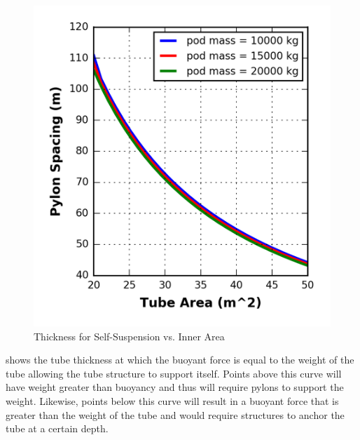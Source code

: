 \begin{figure}
	\centering
	\includegraphics{../../images/graphs/overland_structural_trades/pylon_spacing_vs_tube_area.png}
	\caption{Thickness for Self-Suspension vs. Inner Area}
	\label{fig:thick_susp_vs_area}
\end{figure}

 shows the tube thickness at which the buoyant
force is equal to the weight of the tube allowing the tube structure to support itself.
Points above this curve will have weight greater than buoyancy and thus will
require pylons to support the weight. Likewise, points below this curve will
result in a buoyant force that is greater than the weight of the tube and would
require structures to anchor the tube at a certain depth.

